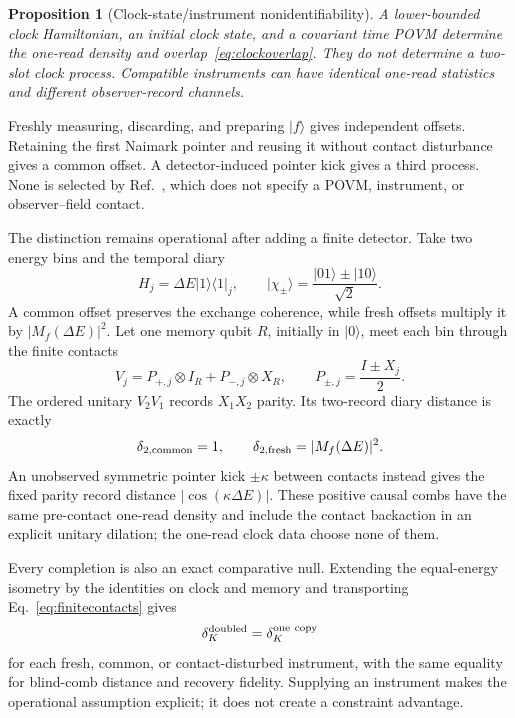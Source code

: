 \documentclass[11pt]{article}
\newtheorem{proposition}{Proposition}
\begin{document}
\begin{proposition}[Clock-state/instrument nonidentifiability]
\label{prop:clockinstrument}
A lower-bounded clock Hamiltonian, an initial clock state, and a covariant
time POVM determine the one-read density and overlap~\eqref{eq:clockoverlap}.
They do not determine a two-slot clock process.  Compatible instruments can
have identical one-read statistics and different observer-record channels.
\end{proposition}

Freshly measuring, discarding, and preparing $|f\rangle$ gives independent
offsets.  Retaining the first Naimark pointer and reusing it without contact
disturbance gives a common offset.  A detector-induced pointer kick gives a
third process.  None is selected by Ref.~\citep{CLPW}, which does not specify a
POVM, instrument, or observer--field contact.

The distinction remains operational after adding a finite detector.  Take two
energy bins and the temporal diary
\begin{equation}
 H_j=\Delta E|1\rangle\!\langle1|_j,
 \qquad
 |\chi_\pm\rangle=\frac{|01\rangle\pm|10\rangle}{\sqrt2}.
 \label{eq:relationaldiary}
\end{equation}
A common offset preserves the exchange coherence, while fresh offsets
multiply it by $|M_f(\Delta E)|^2$.  Let one memory qubit $R$, initially in
$|0\rangle$, meet each bin through the finite contacts
\begin{equation}
 V_j=P_{+,j}\otimes I_R+P_{-,j}\otimes X_R,
 \qquad P_{\pm,j}=\frac{I\pm X_j}{2}.
 \label{eq:finitecontacts}
\end{equation}
The ordered unitary $V_2V_1$ records $X_1X_2$ parity.  Its two-record diary
distance is exactly
\begin{equation}
 \delta_{2,{\rm common}}=1,
 \qquad
 \delta_{2,{\rm fresh}}=|M_f(\Delta E)|^2.
 \label{eq:instrumentdistances}
\end{equation}
An unobserved symmetric pointer kick $\pm\kappa$ between contacts instead
gives the fixed parity record distance $|\cos(\kappa\Delta E)|$.  These
positive causal combs have the same pre-contact one-read density and include
the contact backaction in an explicit unitary dilation; the one-read clock
data choose none of them.

Every completion is also an exact comparative null.  Extending the equal-energy
isometry by the identities on clock and memory and transporting
Eq.~\eqref{eq:finitecontacts} gives
\begin{equation}
 \delta_K^{\rm doubled}=\delta_K^{\rm one\ copy}
 \label{eq:clocknull}
\end{equation}
for each fresh, common, or contact-disturbed instrument, with the same equality
for blind-comb distance and recovery fidelity.  Supplying an instrument makes
the operational assumption explicit; it does not create a constraint
advantage.
\end{document}
